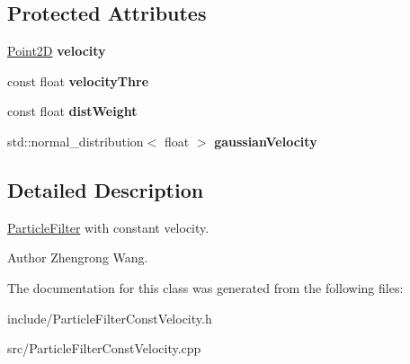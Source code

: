 \subsection*{Protected Attributes}
\begin{DoxyCompactItemize}
\item 
\hypertarget{classParticleFilterConstVelocity_af83994fb61bff4a728acced41bdc8cb5}{}\hyperlink{classPoint2D}{Point2\+D} {\bfseries velocity}\label{classParticleFilterConstVelocity_af83994fb61bff4a728acced41bdc8cb5}

\item 
\hypertarget{classParticleFilterConstVelocity_a8e1644ddf56f1c1b20278ca70cdb62ff}{}const float {\bfseries velocity\+Thre}\label{classParticleFilterConstVelocity_a8e1644ddf56f1c1b20278ca70cdb62ff}

\item 
\hypertarget{classParticleFilterConstVelocity_a022c54f062dd30fb21c73945a888b99f}{}const float {\bfseries dist\+Weight}\label{classParticleFilterConstVelocity_a022c54f062dd30fb21c73945a888b99f}

\item 
\hypertarget{classParticleFilterConstVelocity_a4ebdf630669691c8d00fa1f94022921a}{}std\+::normal\+\_\+distribution$<$ float $>$ {\bfseries gaussian\+Velocity}\label{classParticleFilterConstVelocity_a4ebdf630669691c8d00fa1f94022921a}

\end{DoxyCompactItemize}


\subsection{Detailed Description}
\hyperlink{classParticleFilter}{Particle\+Filter} with constant velocity.

\begin{DoxyAuthor}{Author}
Zhengrong Wang. 
\end{DoxyAuthor}


The documentation for this class was generated from the following files\+:\begin{DoxyCompactItemize}
\item 
include/Particle\+Filter\+Const\+Velocity.\+h\item 
src/Particle\+Filter\+Const\+Velocity.\+cpp\end{DoxyCompactItemize}
